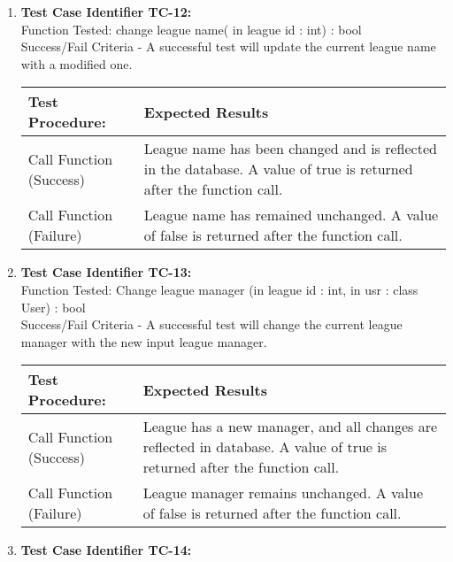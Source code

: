 \begin{enumerate}
  \item
    \textbf{Test Case Identifier TC-12:}\\

    Function Tested: change league name( in league id : int) : bool \\

    Success/Fail Criteria - A successful test will update the current league
    name with a modified one.\\

    \begin{longtable}{|p{2in}|p{4.5in}|}
    \hline
    {\large \color{color1}Test Procedure:}&{\large \color{color1}Expected Results}\\ \hline
    Call Function (Success) & League name has been changed and is reflected in
    the database. A value of true is returned after the function call. \\ \hline
    Call Function (Failure) & League name has remained unchanged. A value of
    false is returned after the function call. \\ \hline
    \end{longtable}
    \vspace{5mm}

  \item
    \textbf{Test Case Identifier TC-13:}\\

    Function Tested: Change league manager (in league id : int, in usr : class
        User) : bool\\

    Success/Fail Criteria - A successful test will change the current league
    manager with the new input league manager. \\

    \begin{longtable}{|p{2in}|p{4.5in}|}
    \hline
    {\large \color{color1}Test Procedure:}&{\large \color{color1}Expected Results}\\ \hline
    Call Function (Success) &League has a new manager, and all changes are
    reflected in database. A value of true is returned after the function call.
    \\ \hline
    Call Function (Failure) & League manager remains unchanged. A value of false
    is returned after the function call. \\ \hline
    \end{longtable}
    \vspace{5mm}

  \item
    \textbf{Test Case Identifier TC-14:}\\


\end{enumerate}
